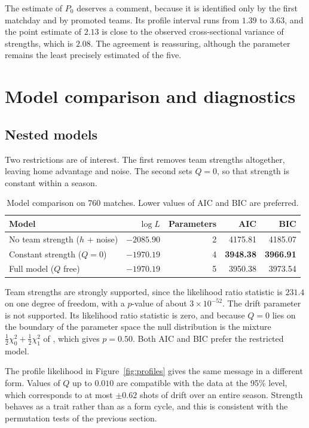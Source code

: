 \documentclass[11pt,a4paper]{article}
\begin{document}
The estimate of $P_0$ deserves a comment, because it is identified only by the first matchday and by
promoted teams. Its profile interval runs from $1.39$ to $3.63$, and the point estimate of $2.13$ is
close to the observed cross-sectional variance of strengths, which is $2.08$. The agreement is
reassuring, although the parameter remains the least precisely estimated of the five.

\section{Model comparison and diagnostics}
\subsection{Nested models}
Two restrictions are of interest. The first removes team strengths altogether, leaving home advantage
and noise. The second sets $Q = 0$, so that strength is constant within a season.

\begin{table}[H]
\centering
\begin{tabular}{lrrrr}
\toprule
Model & $\log L$ & Parameters & AIC & BIC \\
\midrule
No team strength ($h$ + noise) & $-2085.90$ & 2 & 4175.81 & 4185.07 \\
Constant strength ($Q = 0$) & $-1970.19$ & 4 & \textbf{3948.38} & \textbf{3966.91} \\
Full model ($Q$ free) & $-1970.19$ & 5 & 3950.38 & 3973.54 \\
\bottomrule
\end{tabular}
\caption{Model comparison on 760 matches. Lower values of AIC and BIC are preferred.}
\label{tab:aic}
\end{table}

Team strengths are strongly supported, since the likelihood ratio statistic is $231.4$ on one degree
of freedom, with a $p$-value of about $3 \times 10^{-52}$. The drift parameter is not supported. Its
likelihood ratio statistic is zero, and because $Q = 0$ lies on the boundary of the parameter space the
null distribution is the mixture $\tfrac12\chi^2_0 + \tfrac12\chi^2_1$ of \citet{selfliang1987}, which
gives $p = 0.50$. Both AIC and BIC prefer the restricted model.

The profile likelihood in Figure~\ref{fig:profiles} gives the same message in a different form. Values
of $Q$ up to $0.010$ are compatible with the data at the 95\% level, which corresponds to at most
$\pm 0.62$ shots of drift over an entire season. Strength behaves as a trait rather than as a form
cycle, and this is consistent with the permutation tests of the previous section.
\end{document}
